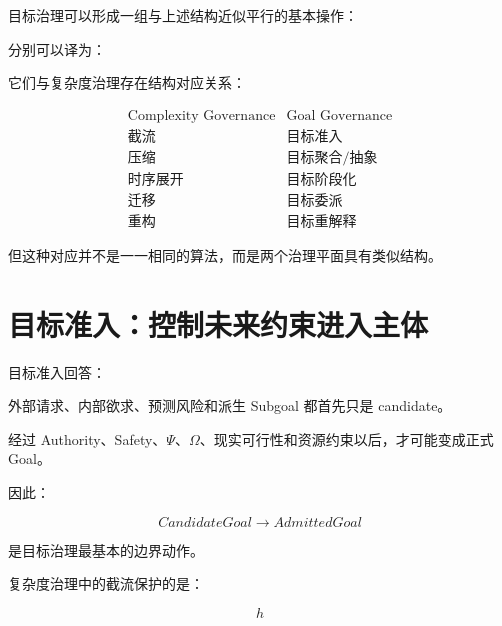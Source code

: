 目标治理可以形成一组与上述结构近似平行的基本操作：

\begin{statementbox}
\centering
{}
\end{statementbox}

分别可以译为：

\begin{statementbox}
\centering
{}
\end{statementbox}

它们与复杂度治理存在结构对应关系：

\[
\begin{array}{c|c}
\text{Complexity Governance}
&
\text{Goal Governance}
\\
\hline
\text{截流}
&
\text{目标准入}
\\
\text{压缩}
&
\text{目标聚合/抽象}
\\
\text{时序展开}
&
\text{目标阶段化}
\\
\text{迁移}
&
\text{目标委派}
\\
\text{重构}
&
\text{目标重解释}
\end{array}
\]

但这种对应并不是一一相同的算法，而是两个治理平面具有类似结构。


\section{目标准入：控制未来约束进入主体}

目标准入回答：

\begin{statementbox}
\centering
{}
\end{statementbox}

外部请求、内部欲求、预测风险和派生 Subgoal 都首先只是 candidate。

经过 Authority、Safety、$\Psi$、$\Omega$、现实可行性和资源约束以后，才可能变成正式 Goal。

因此：

\[
CandidateGoal
\rightarrow
AdmittedGoal
\]

是目标治理最基本的边界动作。

复杂度治理中的截流保护的是：

\[
h
\]

